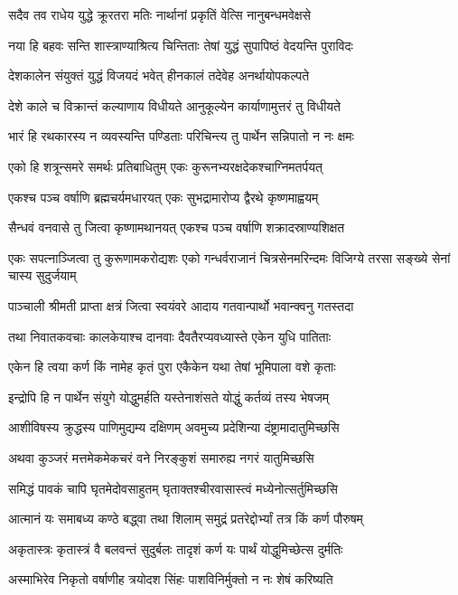 \twolineshloka
{सदैव तव राधेय युद्धे क्रूरतरा मतिः}
{नार्थानां प्रकृतिं वेत्सि नानुबन्धमवेक्षसे}


\twolineshloka
{नया हि बहवः सन्ति शास्त्राण्याश्रित्य चिन्तिताः}
{तेषां युद्धं सुपापिष्ठं वेदयन्ति पुराविदः}


\twolineshloka
{देशकालेन संयुक्तं युद्धं विजयदं भवेत्}
{हीनकालं तदेवेह अनर्थायोपकल्पते}


\twolineshloka
{देशे काले च विक्रान्तं कल्याणाय विधीयते}
{आनुकूल्येन कार्याणामुत्तरं तु विधीयते}


\twolineshloka
{भारं हि रथकारस्य न व्यवस्यन्ति पण्डिताः}
{परिचिन्त्य तु पार्थेन सन्निपातो न नः क्षमः}


\twolineshloka
{एको हि शत्रून्समरे समर्थः प्रतिबाधितुम्}
{एकः कुरूनभ्यरक्षदेकश्चाग्निमतर्पयत्}


\twolineshloka
{एकश्च पञ्च वर्षाणि ब्रह्मचर्यमधारयत्}
{एकः सुभद्रामारोप्य द्वैरथे कृष्णमाह्वयम्}


\twolineshloka
{सैन्धवं वनवासे तु जित्वा कृष्णामथानयत्}
{एकश्च पञ्च वर्षाणि शक्रादस्राण्यशिक्षत}


\threelineshloka
{एकः सपत्नाञ्जित्वा तु कुरूणामकरोद्यशः}
{एको गन्धर्वराजानं चित्रसेनमरिन्दमः}
{विजिग्ये तरसा सङ्ख्ये सेनां चास्य सुदुर्जयाम्}


\twolineshloka
{पाञ्चाली श्रीमती प्राप्ता क्षत्रं जित्वा स्वयंवरे}
{आदाय गतवान्पार्थो भवान्क्वनु गतस्तदा}


\twolineshloka
{तथा निवातकवचाः कालकेयाश्च दानवाः}
{दैवतैरप्यवध्यास्ते एकेन युधि पातिताः}


\twolineshloka
{एकेन हि त्वया कर्ण किं नामेह कृतं पुरा}
{एकैकेन यथा तेषां भूमिपाला वशे कृताः}


\twolineshloka
{इन्द्रोपि हि न पार्थेन संयुगे योद्धुमर्हति}
{यस्तेनाशंसते योद्धुं कर्तव्यं तस्य भेषजम्}


\twolineshloka
{आशीविषस्य क्रुद्धस्य पाणिमुद्यम्य दक्षिणम्}
{अवमुच्य प्रदेशिन्या दंष्ट्रामादातुमिच्छसि}


\twolineshloka
{अथवा कुञ्जरं मत्तमेकमेकचरं वने}
{निरङ्कुशं समारुह्य नगरं यातुमिच्छसि}


\twolineshloka
{समिद्धं पावकं चापि घृतमेदोवसाहुतम्}
{घृताक्तश्चीरवासास्त्वं मध्येनोत्सर्तुमिच्छसि}


\twolineshloka
{आत्मानं यः समाबध्य कण्ठे बद्ध्वा तथा शिलाम्}
{समुद्रं प्रतरेद्दोर्भ्यां तत्र किं कर्ण पौरुषम्}


\twolineshloka
{अकृतास्त्रः कृतास्त्रं वै बलवन्तं सुदुर्बलः}
{तादृशं कर्ण यः पार्थं योद्धुमिच्छेत्स दुर्मतिः}


\twolineshloka
{अस्माभिरेव निकृतो वर्षाणीह त्रयोदश}
{सिंहः पाशविनिर्मुक्तो न नः शेषं करिष्यति}


